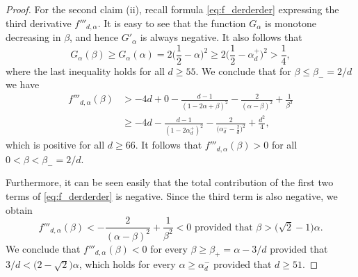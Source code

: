 \documentclass[12pt]{amsart}
\theoremstyle{definition}
\newcommand\al{\alpha}
\newcommand\be{\beta}
\begin{document}
\begin{proof}
For the second claim (ii), recall formula \eqref{eq:f_derderder} expressing the third derivative $f'''_{d,\al}$. It is easy to see that the function $G_\al$ is monotone decreasing in $\be$, and hence $G'_\al$ is always negative. It also follows that 
%
\[ G_\al(\be) \geq G_\al(\al) 
= 2 \bigg( \frac12 - \al \bigg)^2 
\geq 2 \bigg( \frac12 - \al_d^+ \bigg)^2 
> \frac 14,\]
%
where the last inequality holds for all $d \geq 55$. We conclude that for $\be \leq \be_- = 2/d$ we have 
%
\begin{align*}
f'''_{d,\al}(\be) 
&> -4d + 0 
- \frac{d-1}{(1-2\al+\be)^2}
- \frac{2}{(\al-\be)^2}
+ \frac 1 {\be^2} \\
&\geq -4d 
- \frac{d-1}{(1-2\al_d^{+})^2}
- \frac{2}{\big( \al_d^{-} - \frac{2}{d} \big)^2}
+ \frac{d^2}{4} , 
\end{align*}
%
which is positive for all $d \geq 66$. It follows that $f'''_{d,\al}(\be)>0$ for all $0<\be<\be_-=2/d$.

Furthermore, it can be seen easily that the total contribution of the first two terms of \eqref{eq:f_derderder} is negative. Since the third term is also negative, we obtain 
%
\[ f'''_{d,\al}(\be) 
< -\frac{2}{(\al-\be)^2}+\frac 1 {\be^2} < 0 
\text{ provided that } \be > \big( \sqrt{2} -1 \big) \al .\]
%
We conclude that $f'''_{d,\al}(\be)<0$ for every $\be \geq \be_+=\al-3/d$ provided that $3/d < \big( 2-\sqrt{2} \big) \al$, which holds for every $\al \geq \al_d^-$ provided that $d \geq 51$. 


\end{proof}
\end{document}
